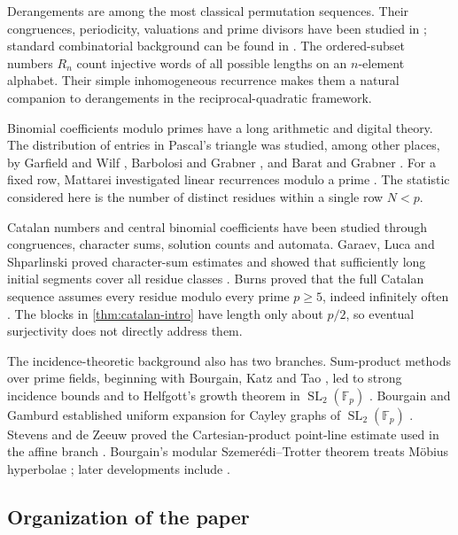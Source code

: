 \documentclass[11pt,reqno]{amsart}
\numberwithin{equation}{section}
\theoremstyle{definition}
\theoremstyle{remark}
\newcommand{\F}{\mathbb F}
\newcommand{\SL}{\operatorname{SL}}
\begin{document}
Derangements are among the most classical permutation sequences.  Their congruences, periodicity, valuations and prime divisors have been studied in \cite{SunZagier2011,Miska2016}; standard combinatorial background can be found in \cite{Stanley2012}.  The ordered-subset numbers $R_n$ count injective words of all possible lengths on an $n$-element alphabet.  Their simple inhomogeneous recurrence makes them a natural companion to derangements in the reciprocal-quadratic framework.

Binomial coefficients modulo primes have a long arithmetic and digital theory.  The distribution of entries in Pascal's triangle was studied, among other places, by Garfield and Wilf \cite{GarfieldWilf1992}, Barbolosi and Grabner \cite{BarbolosiGrabner1996}, and Barat and Grabner \cite{BaratGrabner2001}.  For a fixed row, Mattarei investigated linear recurrences modulo a prime \cite{Mattarei2008}.  The statistic considered here is the number of distinct residues within a single row $N<p$.

Catalan numbers and central binomial coefficients have been studied through congruences, character sums, solution counts and automata.  Garaev, Luca and Shparlinski proved character-sum estimates and showed that sufficiently long initial segments cover all residue classes \cite{GaraevLucaShparlinski2006,GaraevLucaShparlinski2007}.  Burns proved that the full Catalan sequence assumes every residue modulo every prime $p\ge5$, indeed infinitely often \cite{Burns2017}.  The blocks in \cref{thm:catalan-intro} have length only about $p/2$, so eventual surjectivity does not directly address them.

The incidence-theoretic background also has two branches.  Sum-product methods over prime fields, beginning with Bourgain, Katz and Tao \cite{BourgainKatzTao2004}, led to strong incidence bounds and to Helfgott's growth theorem in $\SL_2(\F_p)$ \cite{Helfgott2008}.  Bourgain and Gamburd established uniform expansion for Cayley graphs of $\SL_2(\F_p)$ \cite{BourgainGamburd2008}.  Stevens and de Zeeuw proved the Cartesian-product point-line estimate used in the affine branch \cite{StevensDeZeeuw2017}.  Bourgain's modular Szemer\'edi--Trotter theorem treats M\"obius hyperbolae \cite{Bourgain2012}; later developments include \cite{Shkredov2021,RudnevWheeler2022,WarrenWheeler2023,JingZou2024}.

\subsection{Organization of the paper}
\end{document}
